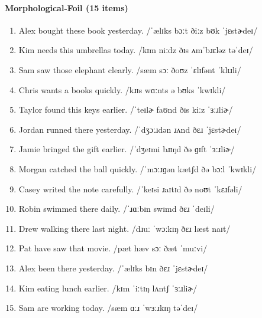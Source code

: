 \documentclass[12pt]{article}
\begin{document}
\paragraph{Morphological-Foil (15 items)}
\begin{enumerate}
\item Alex bought these book yesterday. /ˈælɪks bɔːt ðiːz bʊk ˈjɛstɚdeɪ/
\item Kim needs this umbrellas today. /kɪm niːdz ðɪs ʌmˈbɹɛləz təˈdeɪ/
\item Sam saw those elephant clearly. /sæm sɔː ðoʊz ˈɛlɪfənt ˈklɪɹli/
\item Chris wants a books quickly. /kɹɪs wɑːnts ə bʊks ˈkwɪkli/
\item Taylor found this keys earlier. /ˈteɪlɚ faʊnd ðɪs kiːz ˈɜːɹliɚ/
\item Jordan runned there yesterday. /ˈdʒɔːɹdən ɹʌnd ðɛɹ ˈjɛstɚdeɪ/
\item Jamie bringed the gift earlier. /ˈdʒeɪmi bɹɪŋd ðə ɡɪft ˈɜːɹliɚ/
\item Morgan catched the ball quickly. /ˈmɔːɹɡən kætʃd ðə bɔːl ˈkwɪkli/
\item Casey writed the note carefully. /ˈkeɪsi ɹaɪtɪd ðə noʊt ˈkɛɹfəli/
\item Robin swimmed there daily. /ˈɹɑːbɪn swɪmd ðɛɹ ˈdeɪli/
\item Drew walking there last night. /dɹuː ˈwɔːkɪŋ ðɛɹ læst naɪt/
\item Pat have saw that movie. /pæt hæv sɔː ðæt ˈmuːvi/
\item Alex been there yesterday. /ˈælɪks bɪn ðɛɹ ˈjɛstɚdeɪ/
\item Kim eating lunch earlier. /kɪm ˈiːtɪŋ lʌntʃ ˈɜːɹliɚ/
\item Sam are working today. /sæm ɑːɹ ˈwɜːɹkɪŋ təˈdeɪ/
\end{enumerate}
\end{document}
